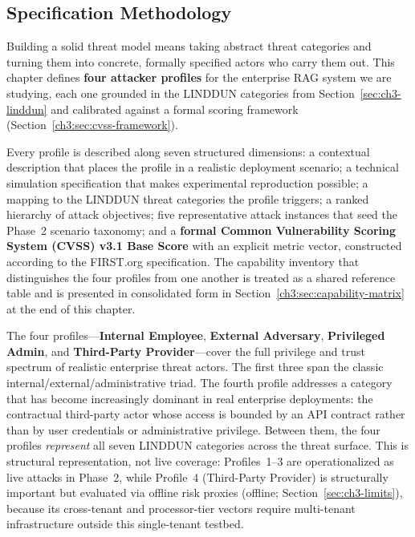 \documentclass[11pt,a4paper]{report}
\begin{document}
\subsection{Specification Methodology}

Building a solid threat model means taking abstract threat categories and
turning them into concrete, formally specified actors who carry them out.
This chapter defines \textbf{four attacker profiles} for the enterprise RAG
system we are studying, each one grounded in the LINDDUN categories from
Section~\ref{sec:ch3-linddun} and calibrated against a formal scoring framework (Section~\ref{ch3:sec:cvss-framework}).

Every profile is described along seven structured dimensions: a contextual
description that places the profile in a realistic deployment scenario; a
technical simulation specification that makes experimental reproduction
possible; a mapping to the LINDDUN threat categories the profile triggers;
a ranked hierarchy of attack objectives; five representative attack
instances that seed the Phase~2 scenario taxonomy; and a \textbf{formal Common Vulnerability Scoring System (CVSS)
v3.1 Base Score} with an explicit metric vector, constructed according
to the FIRST.org specification. The capability inventory that distinguishes
the four profiles from one another is treated as a shared reference table
and is presented in consolidated form in Section~\ref{ch3:sec:capability-matrix}
at the end of this chapter.

The four profiles---\textbf{Internal Employee}, \textbf{External Adversary},
\textbf{Privileged Admin}, and \textbf{Third-Party Provider}---cover the
full privilege and trust spectrum of realistic enterprise threat actors.
The first three span the classic internal/external/administrative triad.
The fourth profile addresses a category that has become increasingly
dominant in real enterprise deployments: the contractual third-party
actor whose access is bounded by an API contract rather than by user
credentials or administrative privilege. Between them, the four profiles
\emph{represent} all seven LINDDUN categories across the threat surface.
This is structural representation, not live coverage: Profiles~1--3 are
operationalized as live attacks in Phase~2, while Profile~4 (Third-Party
Provider) is structurally important but evaluated via offline risk proxies
(offline; Section~\ref{sec:ch3-limits}), because its cross-tenant and processor-tier vectors
require multi-tenant infrastructure outside this single-tenant testbed.
\end{document}
